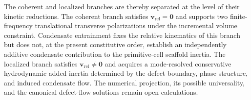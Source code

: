 The coherent and localized branches are thereby separated at the level of their kinetic reductions. The coherent branch satisfies $\mathbf{v}_{\mathrm{rel}} = \mathbf{0}$ and supports two finite-frequency translational transverse polarizations under the incremental volume constraint. Condensate entrainment fixes the relative kinematics of this branch but does not, at the present constitutive order, establish an independently additive condensate contribution to the primitive-cell scaffold inertia. The localized branch satisfies $\mathbf{v}_{\mathrm{rel}} \neq \mathbf{0}$ and acquires a mode-resolved conservative hydrodynamic added inertia determined by the defect boundary, phase structure, and induced condensate flow. The numerical projection, its possible universality, and the canonical defect-flow solutions remain open calculations.
